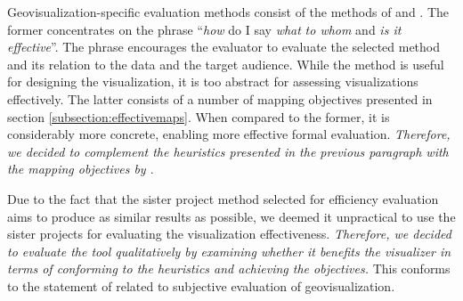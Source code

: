 Geovisualization-specific evaluation methods consist of the methods of \citet{kraak_cartographic_1998} and \citet{schlichtmann_visualization_2002}. The former concentrates on the phrase ``\emph{how} do I say \emph{what} \emph{to whom} and \emph{is it effective}''. The phrase encourages the evaluator to evaluate the selected method and its relation to the data and the target audience. While the method is useful for designing the visualization, it is too abstract for assessing visualizations effectively. The latter consists of a number of mapping objectives presented in section \ref{subsection:effectivemaps}. When compared to the former, it is considerably more concrete, enabling more effective formal evaluation. \emph{Therefore, we decided to complement the heuristics presented in the previous paragraph with the mapping objectives by \citet{schlichtmann_visualization_2002}}.

Due to the fact that the sister project method selected for efficiency evaluation aims to produce as similar results as possible, we deemed it unpractical to use the sister projects for evaluating the visualization effectiveness. \emph{Therefore, we decided to evaluate the tool qualitatively by examining whether it benefits the visualizer in terms of conforming to the heuristics and achieving the objectives.} This conforms to the statement of \citet{kraak_cartographic_1998} related to subjective evaluation of geovisualization.
